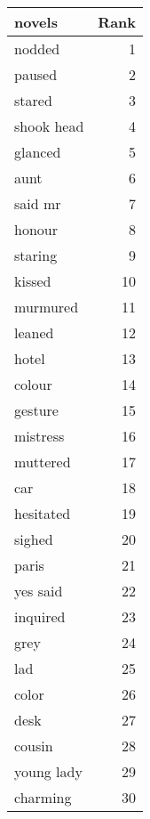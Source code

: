 \begin{table}
\label{tab:novels_terms}
\begin{tabular}{lr}
\toprule
novels & Rank \\
\midrule
nodded & 1 \\
paused & 2 \\
stared & 3 \\
shook head & 4 \\
glanced & 5 \\
aunt & 6 \\
said mr & 7 \\
honour & 8 \\
staring & 9 \\
kissed & 10 \\
murmured & 11 \\
leaned & 12 \\
hotel & 13 \\
colour & 14 \\
gesture & 15 \\
mistress & 16 \\
muttered & 17 \\
car & 18 \\
hesitated & 19 \\
sighed & 20 \\
paris & 21 \\
yes said & 22 \\
inquired & 23 \\
grey & 24 \\
lad & 25 \\
color & 26 \\
desk & 27 \\
cousin & 28 \\
young lady & 29 \\
charming & 30 \\
\bottomrule
\end{tabular}
\end{table}
